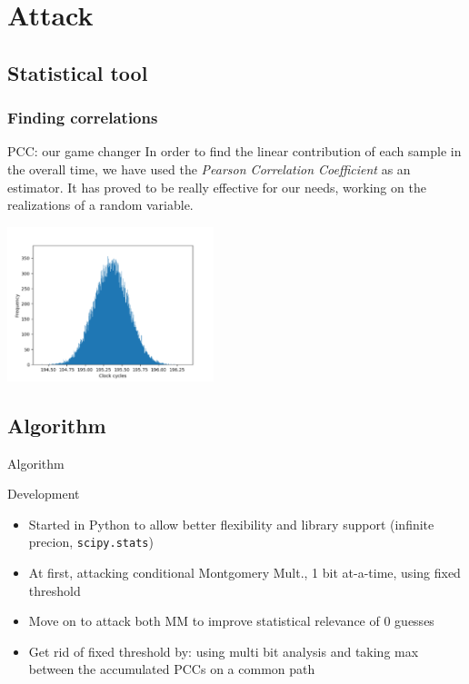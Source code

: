 \documentclass{beamer}
\begin{document}

\section{Attack}
\subsection{Statistical tool}
\begin{frame}[fragile]
	\frametitle{Finding correlations}
	\begin{block}{PCC: our game changer}
		In order to find the linear contribution of each sample in the overall time, we have used the \textit{Pearson Correlation Coefficient} as an estimator. It has proved to be really effective for our needs, working on the realizations of a random variable.
	\end{block}
	\begin{center}
		\includegraphics[width=6cm]{./graphics/rand_distr}
	\end{center}
\end{frame}

\subsection{Algorithm}

\begin{frame}{Algorithm}
    \begin{block}{Development}
        \begin{itemize}
            \pause \item Started in Python to allow better flexibility and library support (infinite precion, \texttt{scipy.stats})
            \pause \item At first, attacking conditional Montgomery Mult., 1 bit at-a-time, using fixed threshold
            \pause \item Move on to attack both MM to improve statistical relevance of 0 guesses
            \pause \item Get rid of fixed threshold by: using multi bit analysis and taking max between the accumulated PCCs on a common path
        \end{itemize}
    \end{block}
\end{frame}
\end{document}
